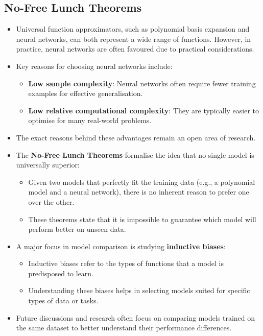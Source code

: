 \subsection{No-Free Lunch Theorems}

\begin{itemize}
    \item Universal function approximators, such as polynomial basis expansion and neural networks, can both represent a wide range of functions. However, in practice, neural networks are often favoured due to practical considerations.
    \item Key reasons for choosing neural networks include:
    \begin{itemize}
        \item \textbf{Low sample complexity}: Neural networks often require fewer training examples for effective generalisation.
        \item \textbf{Low relative computational complexity}: They are typically easier to optimise for many real-world problems.
    \end{itemize}
    \item The exact reasons behind these advantages remain an open area of research.
    \item The \textbf{No-Free Lunch Theorems} formalise the idea that no single model is universally superior:
    \begin{itemize}
        \item Given two models that perfectly fit the training data (e.g., a polynomial model and a neural network), there is no inherent reason to prefer one over the other.
        \item These theorems state that it is impossible to guarantee which model will perform better on unseen data.
    \end{itemize}
    \item A major focus in model comparison is studying \textbf{inductive biases}:
    \begin{itemize}
        \item Inductive biases refer to the types of functions that a model is predisposed to learn.
        \item Understanding these biases helps in selecting models suited for specific types of data or tasks.
    \end{itemize}
    \item Future discussions and research often focus on comparing models trained on the same dataset to better understand their performance differences.
\end{itemize}


